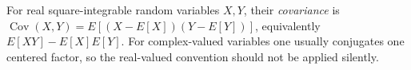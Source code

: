 
For real square-integrable random variables $X,Y$, their \emph{covariance} is $\operatorname{Cov}(X,Y)=E[(X-E[X])(Y-E[Y])]$, equivalently $E[XY]-E[X]E[Y]$. For complex-valued variables one usually conjugates one centered factor, so the real-valued convention should not be applied silently.
